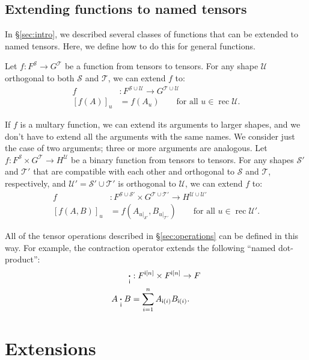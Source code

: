 \documentclass{article}
\DeclareMathOperator{\rec}{rec}
\newcommand{\restrict}[2]{\left.#1\right|_{#2}}
\begin{document}
\subsection{Extending functions to named tensors}
\label{sec:tensorfunctions}

In \S\ref{sec:intro}, we described several classes of functions that can be extended to named tensors. Here, we define how to do this for general functions.

Let $f \colon F^{\mathcal{S}} \rightarrow G^{\mathcal{T}}$ be a function from tensors to tensors. For any shape $\mathcal{U}$ orthogonal to both $\mathcal{S}$ and $\mathcal{T}$, we can extend $f$ to:
\begin{align*}
f &: F^{\mathcal{S} \cup \mathcal{U}} \rightarrow G^{\mathcal{T} \cup \mathcal{U}} \\
[f(A)]_u &= f(A_u) \qquad \text{for all $u \in \rec\mathcal{U}$.}
\end{align*}

If $f$ is a multary function, we can extend its arguments to larger shapes, and we don't have to extend all the arguments with the same names. We consider just the case of two arguments; three or more arguments are analogous. Let $f \colon F^{\mathcal{S}} \times G^{\mathcal{T}} \rightarrow H^{\mathcal{U}}$ be a binary function from tensors to tensors. For any shapes $\mathcal{S'}$ and $\mathcal{T'}$ that are compatible with each other and orthogonal to $\mathcal{S}$ and $\mathcal{T}$, respectively, and $\mathcal{U'} = \mathcal{S'} \cup \mathcal{T'}$ is orthogonal to $\mathcal{U}$, we can extend $f$ to:
\begin{align*}
f &: F^{\mathcal{S} \cup \mathcal{S'}} \times G^{\mathcal{T} \cup \mathcal{T'}} \rightarrow H^{\mathcal{U} \cup \mathcal{U'}} \\
  [f(A,B)]_u &= f\left(A_{\restrict{u}{\mathcal{S'}}},B_{\restrict{u}{\mathcal{T'}}}\right) \qquad \text{for all $u \in \rec\mathcal{U'}$.}
\end{align*}

All of the tensor operations described in \S\ref{sec:operations} can be defined in this way. For example, the contraction operator extends the following ``named dot-product'':
\begin{align*}
\mathbin{\mathop{\boldsymbol\cdot}\limits_{\mathsf{i}}} &: F^{\mathsf{i}[n]} \times F^{\mathsf{i}[n]} \rightarrow F \\
A \mathbin{\mathop{\boldsymbol\cdot}\limits_{\mathsf{i}}} B &= \sum_{i=1}^n A_{\mathsf{i}(i)} B_{\mathsf{i}(i)}.
\end{align*}

\section{Extensions}
\end{document}
